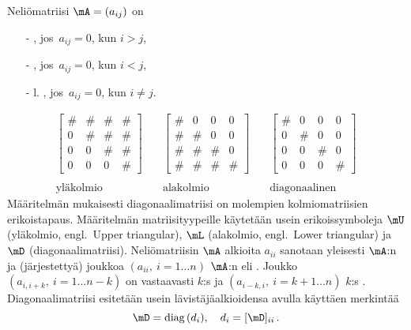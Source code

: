 \begin{Def}  
Neliömatriisi $\mA = (a_{ij})$ on
\begin{itemize}
\item[-] , jos $\,a_{ij}=0$, kun $i>j$,
\item[-] , jos $\,a_{ij}=0$, kun $i<j$,
\item[-]  l. , jos $\,a_{ij} = 0$, kun $i \neq j$.
\end{itemize}
\end{Def}
\[
\begin{array}{ccc}
\begin{bmatrix} 
\# & \# & \# & \# \\ 0 & \# & \# & \# \\ 0 & 0 & \# & \# \\ 0 & 0 & 0 & \# 
\end{bmatrix} \quad & 
\begin{bmatrix} 
\# & 0 & 0 & 0 \\ \# & \# & 0 & 0 \\ \# & \# & \# & 0 \\ \# & \# & \# & \# 
\end{bmatrix} \quad &
\begin{bmatrix} 
\# & 0 & 0 & 0 \\ 0 & \# & 0 & 0 \\ 0 & 0 & \# & 0 \\ 0 & 0 & 0 & \# 
\end{bmatrix} \\ \\
\text{yläkolmio}\ \ \ & \text{alakolmio}\ \ & \text{diagonaalinen}
\end{array}
\] 
Määritelmän mukaisesti diagonaalimatriisi on molempien kolmiomatriisien
erikoistapaus. Määritelmän matriisityypeille käytetään usein erikoissymboleja $\mU$ 
(yläkolmio, engl.\ Upper triangular), $\mL$ (alakolmio, engl.\ Lower triangular) ja $\mD$ 
(diagonaalimatriisi). Neliömatriisin $\mA$ alkioita $a_{ii}$ sanotaan yleisesti $\mA$:n 
 ja (järjestettyä) joukkoa  $(a_{ii},\ i = 1 \ldots n)$ $\mA$:n
 eli . Joukko $(a_{i,i+k},\ i = 1 \ldots n-k)$ on
vastaavasti
$k$:s  ja $(a_{i-k,i},\ i = k+1 \ldots n)$ $k$:s .
Diagonaalimatriisi esitetään usein lävistäjäalkioidensa avulla käyttäen merkintää 
\[
\mD = \text{diag} \, (d_i), \quad d_i=[\mD]_{ii}\,.
\]

